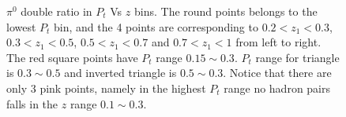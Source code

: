  \begin{figure}[H]
  \centering     
\caption{$\pi^0$ double ratio in $P_t$ Vs $z$ bins. The round points belongs to the lowest $P_t$ bin, and the 4 points are corresponding to $0.2<z_1<0.3$,$0.3<z_1<0.5$, $0.5<z_1<0.7$ and $0.7<z_1<1$ from left to right. The red square points have $P_t$ range $0.15\sim 0.3$. $P_t$ range for triangle is $0.3\sim 0.5$ and inverted triangle is $0.5\sim0.3$. Notice that there are only 3 pink points, namely in the highest $P_t$ range no hadron pairs falls in the $z$ range $0.1\sim 0.3$.}
  \label{fig:ptzresult}
\end{figure}
